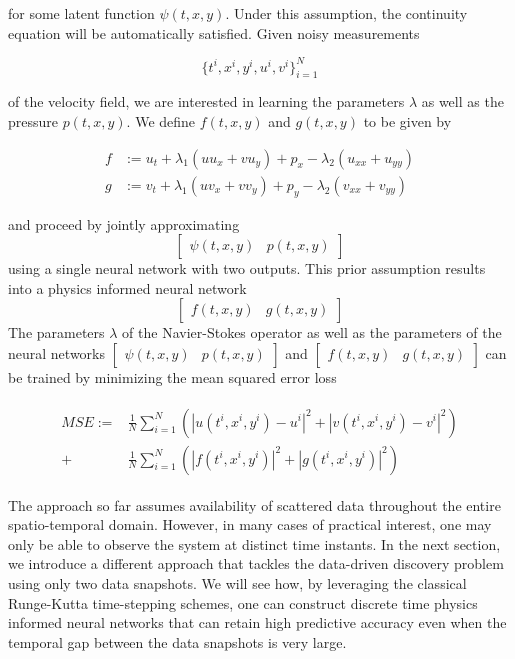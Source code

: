 \documentclass[book.tex]{subfiles}
\begin{document}
for some latent function $\psi(t,x,y)$. Under this assumption, the continuity equation will be automatically satisfied. Given noisy measurements

\begin{equation}
\{t^i, x^i, y^i, u^i, v^i\}_{i=1}^{N}    
\end{equation}


of the velocity field, we are interested in learning the parameters $\lambda$ as well as the pressure $p(t,x,y)$. We define $f(t,x,y)$ and $g(t,x,y)$ to be given by

\begin{align}
f &:= u_t + \lambda_1 (u u_x + v u_y) + p_x - \lambda_2(u_{xx} + u_{yy})\\
g &:= v_t + \lambda_1 (u v_x + v v_y) + p_y - \lambda_2(v_{xx} + v_{yy})        
\end{align}

\noindent and proceed by jointly approximating \[\begin{bmatrix}
\psi(t,x,y) & p(t,x,y)
\end{bmatrix} \] 
using a single neural network with two outputs. This prior assumption results into a physics informed neural network \[\begin{bmatrix}
f(t,x,y) & g(t,x,y)
\end{bmatrix} \]
The parameters $\lambda$ of the Navier-Stokes operator as well as the parameters of the neural networks $\begin{bmatrix}
\psi(t,x,y) & p(t,x,y)
\end{bmatrix}$ and $\begin{bmatrix}
f(t,x,y) & g(t,x,y)
\end{bmatrix}$ can be trained by minimizing the mean squared error loss


\begin{align}
    \begin{split}
    MSE :=& \frac{1}{N}\sum_{i=1}^{N} \left(|u(t^i,x^i,y^i) - u^i|^2 + |v(t^i,x^i,y^i) - v^i|^2\right) \\
    +& \frac{1}{N}\sum_{i=1}^{N} \left(|f(t^i,x^i,y^i)|^2 + |g(t^i,x^i,y^i)|^2\right)
    \end{split}
\end{align}



The approach so far assumes availability of scattered data throughout the entire spatio-temporal domain. However, in many cases of practical interest, one may only be able to observe the system at distinct time instants. In the next section, we introduce a different approach that tackles the data-driven discovery problem using only two data snapshots. We will see how, by leveraging the classical Runge-Kutta time-stepping schemes, one can construct discrete time physics informed neural networks that can retain high predictive accuracy even when the temporal gap between the data snapshots is very large.
\end{document}
